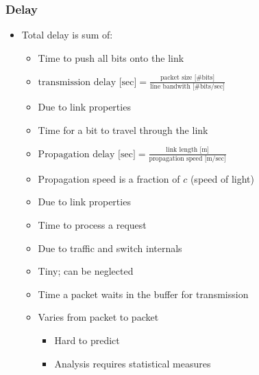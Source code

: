 \subsubsection{Delay}
\begin{itemize}
    \item Total delay is sum of:
        \begin{itemize}
                \begin{itemize}
                    \item Time to push all bits onto the link
                    \item $\text{transmission delay [sec]} = \frac{\text{packet size [\# bits]}}{\text{line bandwith [\# bits/sec]}}$
                    \item Due to link properties
                \end{itemize}
                \begin{itemize}
                    \item Time for a bit to travel through the link
                    \item $\text{Propagation delay [sec]} = \frac{\text{link length [m]}}{\text{propagation speed [m/sec]}}$
                    \item Propagation speed is a fraction of $c$ (speed of light)
                    \item Due to link properties
                \end{itemize}
                \begin{itemize}
                    \item Time to process a request
                    \item Due to traffic and switch internals
                    \item Tiny; can be neglected
                \end{itemize}
                \begin{itemize}
                    \item Time a packet waits in the buffer for transmission
                    \item Varies from packet to packet
                        \begin{itemize}
                            \item Hard to predict
                            \item Analysis requires statistical measures

\end{itemize}
\end{itemize}
\end{itemize}
\end{itemize}
